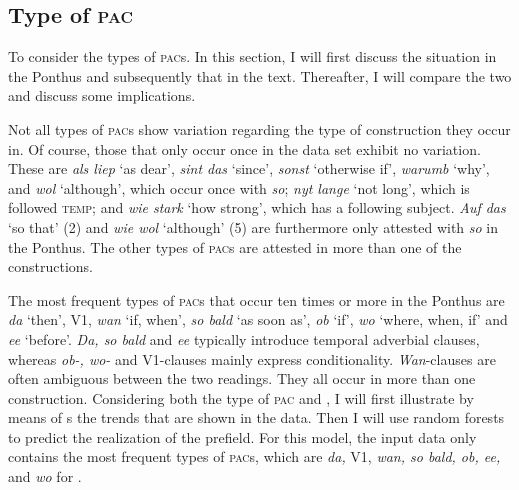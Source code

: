 \documentclass[output=paper,colorlinks,citecolor=brown]{langscibook}
\begin{document}
\subsection{Type of \textsc{pac}}\label{sec:5.2}
To consider the types of \textsc{pac}s. In this section, I will first discuss the situation in the  Ponthus and subsequently that in the  text. Thereafter, I will compare the two and discuss some implications.

Not all types of \textsc{pac}s show variation regarding the type of construction they occur in. Of course, those that only occur once in the data set exhibit no variation. These are \textit{als liep} `as dear', \textit{sint das} `since', \textit{sonst} `otherwise if', \textit{warumb} `why', and \textit{wol} `although', which occur once with \textit{so}; \textit{nyt lange} `not long', which is followed \textsc{temp}; and \textit{wie stark} `how strong', which has a following subject. \textit{Auf das} `so that' (2) and \textit{wie wol} `although' (5) are furthermore only attested with \textit{so} in the  Ponthus. The other types of \textsc{pac}s are attested in more than one of the constructions.

The most frequent types of \textsc{pac}s that occur ten times or more in the  Ponthus are \textit{da} `then', V1, \textit{wan} `if, when', \textit{so bald} `as soon as', \textit{ob} `if', \textit{wo} `where, when, if' and \textit{ee} `before'. \textit{Da, so bald} and \textit{ee} typically introduce temporal adverbial clauses, whereas \textit{ob-, wo-} and V1-clauses mainly express conditionality. \textit{Wan}-clauses are often ambiguous between the two readings. They all occur in more than one construction. Considering both the type of \textsc{pac} and , I will first illustrate by means of s the trends that are shown in the data. Then I will use random forests to predict the realization of the prefield. For this model, the input data only contains the most frequent types of \textsc{pac}s, which are \textit{da,} V1, \textit{wan, so bald, ob, ee,} and \textit{wo} for .
\end{document}

